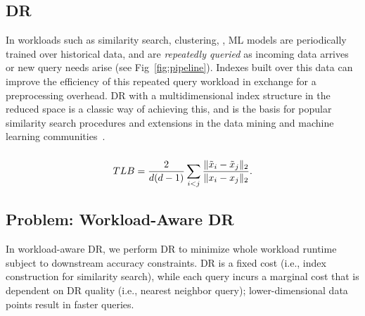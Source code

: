 \subsection{DR }

In workloads such as similarity search, clustering, , ML models are periodically trained over historical data, and are \emph{repeatedly queried} as incoming data arrives or new query needs arise (see Fig~\ref{fig:pipeline}). 
Indexes built over this data can improve the efficiency of this repeated query workload in exchange for a preprocessing overhead.
DR with a multidimensional index structure in the reduced space is a classic way of achieving this, and is the basis for popular similarity search procedures and extensions in the data mining and machine learning communities~\cite{local-dr,dynamic-ss,dm-book,humming-index,decade,search}.


\subsubsection*{}
\begin{equation}
\label{eq:tlb}
TLB = \frac{2}{{\color{black}d}({\color{black}d}-1)}\sum_{i<j}\frac{\| \tilde{x}_i -  \tilde{x}_j \|_2 }{\| x_i -  x_j\|_2 }.
\end{equation}


\subsection{Problem: Workload-Aware DR}
\label{subsec:wadr}

In workload-aware DR, we perform DR to minimize whole workload runtime subject to downstream accuracy constraints.
DR is a fixed cost (i.e., index construction for similarity search), while each query incurs a marginal cost that is dependent on DR quality (i.e., nearest neighbor query); lower-dimensional data points result in faster queries. 

